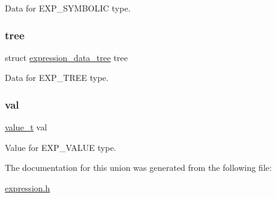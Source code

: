 Data for E\+X\+P\+\_\+\+S\+Y\+M\+B\+O\+L\+IC type. 

\mbox{\label{unionexpression__data_a786f772ef255a1ea6fbb97622b000bc1}} 
\subsubsection{\texorpdfstring{tree}{tree}}
{\footnotesize\ttfamily struct \hyperlink{structexpression__data__tree}{expression\+\_\+data\+\_\+tree} tree}



Data for E\+X\+P\+\_\+\+T\+R\+EE type. 

\mbox{\label{unionexpression__data_a9999269c3069b319f17690c708789d42}} 
\subsubsection{\texorpdfstring{val}{val}}
{\footnotesize\ttfamily \hyperlink{types_8h_ae4d4f561b975159d5852cb2c30bf20ef}{value\+\_\+t} val}



Value for E\+X\+P\+\_\+\+V\+A\+L\+UE type. 



The documentation for this union was generated from the following file\+:\begin{DoxyCompactItemize}
\item 
\hyperlink{expression_8h}{expression.\+h}\end{DoxyCompactItemize}

